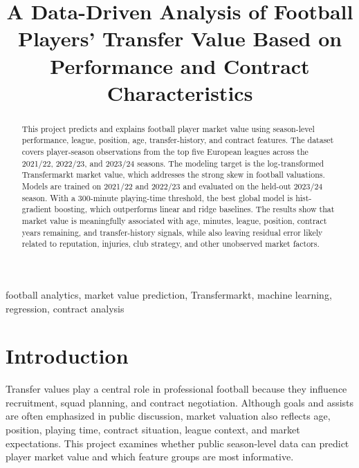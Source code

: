 \documentclass[conference]{IEEEtran}
\begin{document}
\title{A Data-Driven Analysis of Football Players' Transfer Value Based on Performance and Contract Characteristics}

\author{
\and
{}
}

\maketitle

\begin{abstract}
This project predicts and explains football player market value using season-level performance, league, position, age, transfer-history, and contract features. The dataset covers player-season observations from the top five European leagues across the 2021/22, 2022/23, and 2023/24 seasons. The modeling target is the log-transformed Transfermarkt market value, which addresses the strong skew in football valuations. Models are trained on 2021/22 and 2022/23 and evaluated on the held-out 2023/24 season. With a 300-minute playing-time threshold, the best global model is hist-gradient boosting, which outperforms linear and ridge baselines. The results show that market value is meaningfully associated with age, minutes, league, position, contract years remaining, and transfer-history signals, while also leaving residual error likely related to reputation, injuries, club strategy, and other unobserved market factors.
\end{abstract}

\begin{IEEEkeywords}
football analytics, market value prediction, Transfermarkt, machine learning, regression, contract analysis
\end{IEEEkeywords}

\section{Introduction}
Transfer values play a central role in professional football because they influence recruitment, squad planning, and contract negotiation. Although goals and assists are often emphasized in public discussion, market valuation also reflects age, position, playing time, contract situation, league context, and market expectations. This project examines whether public season-level data can predict player market value and which feature groups are most informative.
\end{document}
